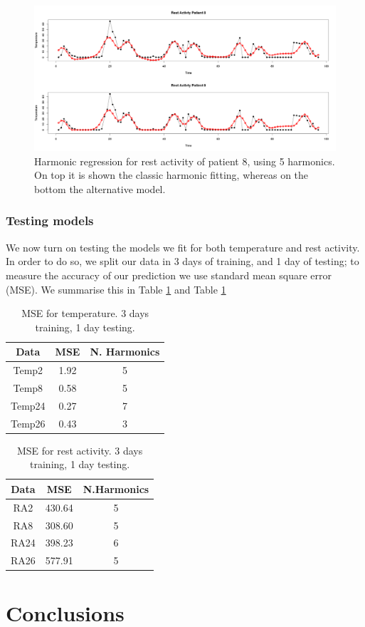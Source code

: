 \documentclass[]{article}
\begin{document}
\begin{figure}[htbp]\centering
	\includegraphics[scale = 0.22]{fit_rest_activty_Patient_8.png}
	\caption{Harmonic regression for rest activity of patient 8, using 5 harmonics. On top it is shown the classic harmonic fitting, whereas on the bottom the alternative model. }
	\label{fig:fit_restactivity.temp8}
\end{figure}


\subsubsection*{Testing models}
We now turn on testing the models we fit for both temperature and rest activity. In order to do so, we split our data in 3 days of training, and 1 day of testing; to measure the accuracy of our prediction we use standard mean square error (MSE). We summarise this in Table \ref{table:test.Temp} and Table \ref{table:test.Temp}

\begin{table}[htbp]
\begin{center}
\begin{tabular}{ ccc } 
 Data & MSE & N. Harmonics \\
  \hline
 Temp2 & 1.92 & 5 \\
 Temp8 & 0.58 & 5\\
 Temp24& 0.27 & 7\\
 Temp26& 0.43 & 3\\
\end{tabular}
\end{center}
\caption{MSE for temperature. 3 days training, 1 day testing.}
\label{table:test.Temp}
\end{table}


\begin{table}[htbp]
\begin{center}
\begin{tabular}{ ccc } 
 Data & MSE & N.Harmonics \\
  \hline
 RA2 & 430.64 & 5 \\
 RA8 & 308.60 & 5\\
 RA24& 398.23 & 6\\
 RA26& 577.91 & 5\\
\end{tabular}
\end{center}
\caption{MSE for rest activity. 3 days training, 1 day testing.}
\label{table:test.RA}
\end{table}

\section{Conclusions}
\end{document}
